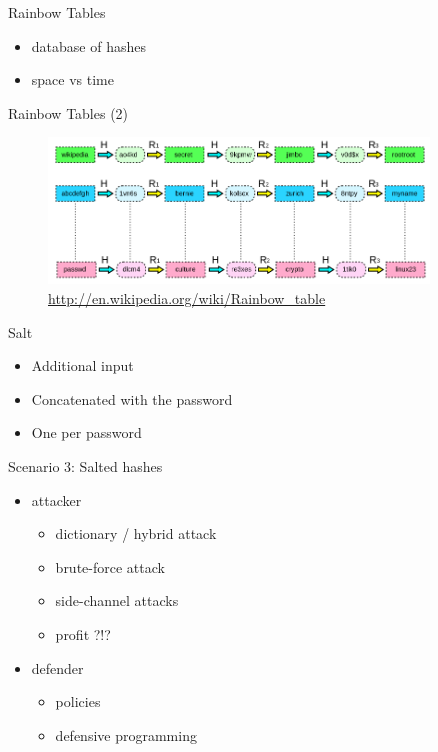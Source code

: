\documentclass{curs}
\begin{document}
\begin{frame}{Rainbow Tables}
  \begin{itemize}
    \item database of hashes
    \item space vs time
  \end{itemize}
\end{frame}

\begin{frame}{Rainbow Tables (2)}
  \begin{figure}
    \centering
    \includegraphics[width=0.9\textwidth]{img/rainbow-table.png} \\
    \tiny{\url{http://en.wikipedia.org/wiki/Rainbow_table}}
  \end{figure}
\end{frame}

\begin{frame}{Salt}
  \begin{itemize}
    \item Additional input
    \item Concatenated with the password
    \item One per password
  \end{itemize}
\end{frame}

\begin{frame}{Scenario 3: Salted hashes}
  \begin{itemize}
    \item attacker
      \begin{itemize}
        \item dictionary / hybrid attack
        \item brute-force attack
        \item side-channel attacks
        \item profit ?!?
      \end{itemize}
    \item defender \begin{itemize}
      \item policies
      \item defensive programming
    \end{itemize}
  \end{itemize}
\end{frame}
\end{document}
